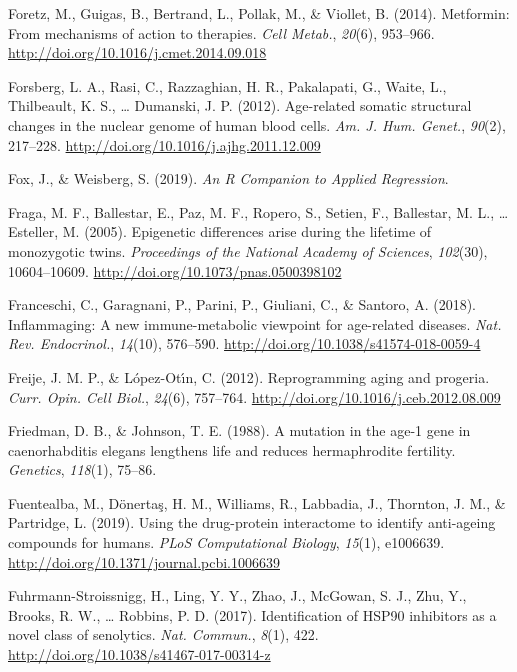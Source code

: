 \documentclass[12pt,twoside]{unicam}
\begin{document}
\begin{cslreferences}
\leavevmode\hypertarget{ref-Foretz2014}{}%
Foretz, M., Guigas, B., Bertrand, L., Pollak, M., \& Viollet, B. (2014). Metformin: From mechanisms of action to therapies. \emph{Cell Metab.}, \emph{20}(6), 953--966. \url{http://doi.org/10.1016/j.cmet.2014.09.018}

\leavevmode\hypertarget{ref-Forsberg2012}{}%
Forsberg, L. A., Rasi, C., Razzaghian, H. R., Pakalapati, G., Waite, L., Thilbeault, K. S., \ldots{} Dumanski, J. P. (2012). Age-related somatic structural changes in the nuclear genome of human blood cells. \emph{Am. J. Hum. Genet.}, \emph{90}(2), 217--228. \url{http://doi.org/10.1016/j.ajhg.2011.12.009}

\leavevmode\hypertarget{ref-Fox2019}{}%
Fox, J., \& Weisberg, S. (2019). \emph{An R Companion to Applied Regression}.

\leavevmode\hypertarget{ref-Fraga2005}{}%
Fraga, M. F., Ballestar, E., Paz, M. F., Ropero, S., Setien, F., Ballestar, M. L., \ldots{} Esteller, M. (2005). Epigenetic differences arise during the lifetime of monozygotic twins. \emph{Proceedings of the National Academy of Sciences}, \emph{102}(30), 10604--10609. \url{http://doi.org/10.1073/pnas.0500398102}

\leavevmode\hypertarget{ref-Franceschi2018}{}%
Franceschi, C., Garagnani, P., Parini, P., Giuliani, C., \& Santoro, A. (2018). Inflammaging: A new immune-metabolic viewpoint for age-related diseases. \emph{Nat. Rev. Endocrinol.}, \emph{14}(10), 576--590. \url{http://doi.org/10.1038/s41574-018-0059-4}

\leavevmode\hypertarget{ref-Freije2012}{}%
Freije, J. M. P., \& López-Otı́n, C. (2012). Reprogramming aging and progeria. \emph{Curr. Opin. Cell Biol.}, \emph{24}(6), 757--764. \url{http://doi.org/10.1016/j.ceb.2012.08.009}

\leavevmode\hypertarget{ref-Friedman1988}{}%
Friedman, D. B., \& Johnson, T. E. (1988). A mutation in the age-1 gene in caenorhabditis elegans lengthens life and reduces hermaphrodite fertility. \emph{Genetics}, \emph{118}(1), 75--86.

\leavevmode\hypertarget{ref-Fuentealba2019}{}%
Fuentealba, M., Dönertaş, H. M., Williams, R., Labbadia, J., Thornton, J. M., \& Partridge, L. (2019). Using the drug-protein interactome to identify anti-ageing compounds for humans. \emph{PLoS Computational Biology}, \emph{15}(1), e1006639. \url{http://doi.org/10.1371/journal.pcbi.1006639}

\leavevmode\hypertarget{ref-Fuhrmann-Stroissnigg2017}{}%
Fuhrmann-Stroissnigg, H., Ling, Y. Y., Zhao, J., McGowan, S. J., Zhu, Y., Brooks, R. W., \ldots{} Robbins, P. D. (2017). Identification of HSP90 inhibitors as a novel class of senolytics. \emph{Nat. Commun.}, \emph{8}(1), 422. \url{http://doi.org/10.1038/s41467-017-00314-z}


\end{cslreferences}
\end{document}

